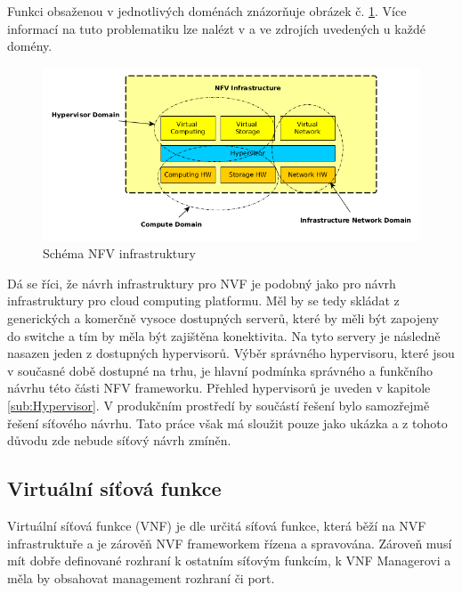 Funkci obsaženou v jednotlivých doménách znázorňuje obrázek č. \ref{fig:infrastruktura}. Více informací na tuto problematiku lze nalézt v \cite{NFV_infrastructure} a ve zdrojích uvedených u každé domény. 

\begin{figure}[h]
\begin{centering}
\includegraphics[scale=0.65]{images/infrastruktura}
\par\end{centering}
\caption{Schéma NFV infrastruktury\label{fig:infrastruktura}}
\end{figure}

Dá se říci, že návrh infrastruktury pro NVF je podobný jako pro návrh infrastruktury pro cloud computing platformu. Měl by se tedy skládat z generických a komerčně vysoce dostupných serverů, které by měli být zapojeny do switche a tím by měla být zajištěna konektivita. Na tyto servery je následně nasazen jeden z dostupných hypervisorů. Výběr správného hypervisoru, které jsou v současné době dostupné na trhu, je hlavní podmínka správného a funkčního návrhu této části NFV frameworku. Přehled hypervisorů je uveden v kapitole \ref{sub:Hypervisor}. V produkčním prostředí by součástí řešení bylo samozřejmě řešení síťového návrhu. Tato práce však má sloužit pouze jako ukázka a z tohoto důvodu zde nebude síťový návrh zmíněn.

\subsection{Virtuální síťová funkce}

Virtuální síťová funkce (VNF) je dle \cite{NFV_VNF} určitá síťová funkce, která běží na NVF infrastruktuře a je zárověň NVF frameworkem řízena a spravována. Zároveň musí mít dobře definované rozhraní k ostatním síťovým funkcím, k VNF Managerovi a měla by obsahovat management rozhraní či port. 

